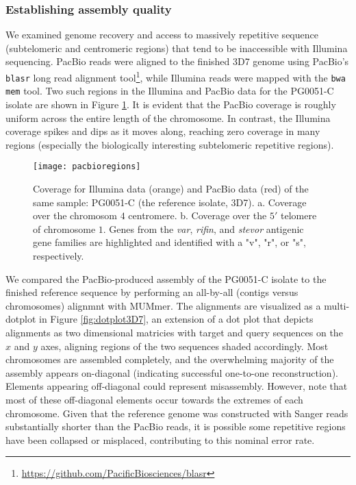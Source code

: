 \subsubsection{Establishing assembly quality}
We examined genome recovery and access to massively repetitive sequence (subtelomeric and centromeric regions) that tend to be inaccessible with Illumina sequencing.  PacBio reads were aligned to the finished 3D7 genome using PacBio's \texttt{blasr} long read alignment tool\footnote{\url{https://github.com/PacificBiosciences/blasr}}, while Illumina reads were mapped with the \texttt{bwa mem} tool.  Two such regions in the Illumina and PacBio data for the PG0051-C isolate are shown in Figure \ref{fig:pacbioregions}.  It is evident that the PacBio coverage is roughly uniform across the entire length of the chromosome. In contrast, the Illumina coverage spikes and dips as it moves along, reaching zero coverage in many regions (especially the biologically interesting subtelomeric repetitive regions).

\begin{figure}[h!]
  \centering
    \texttt{[image: pacbioregions]}
  \caption{Coverage for Illumina data (orange) and PacBio data (red) of the same sample: PG0051-C (the reference isolate, 3D7).  a. Coverage over the chromosom $4$ centromere.  b. Coverage over the $5'$ telomere of chromosome $1$.  Genes from the \textit{var}, \textit{rifin}, and \textit{stevor} antigenic gene families are highlighted and identified with a "v", "r", or "s", respectively.}
  \label{fig:pacbioregions}
\end{figure}

We compared the PacBio-produced assembly of the PG0051-C isolate to the finished reference sequence by performing an all-by-all (contigs versus chromosomes) alignmnt with MUMmer\cite{Versatileandopens:2004dy}.  The alignments are visualized as a multi-dotplot in Figure \ref{fig:dotplot3D7}, an extension of a dot plot that depicts alignments as two dimensional matricies with target and query sequences on the $x$ and $y$ axes, aligning regions of the two sequences shaded accordingly\cite{Gibbs:1970jf}.  Most chromosomes are assembled completely, and the overwhelming majority of the assembly appears on-diagonal (indicating successful one-to-one reconstruction).  Elements appearing off-diagonal could represent misassembly.  However, note that most of these off-diagonal elements occur towards the extremes of each chromosome.  Given that the reference genome was constructed with Sanger reads substantially shorter than the PacBio reads, it is possible some repetitive regions have been collapsed or misplaced, contributing to this nominal error rate.

